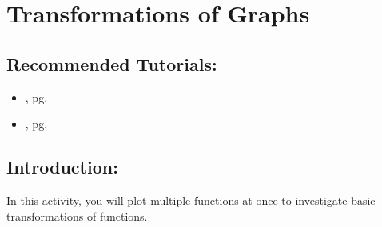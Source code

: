 \section{Transformations of Graphs}
\label{sec:transformations_of_graphs}

\subsection*{Recommended Tutorials:}
\begin{itemize}[noitemsep]
	\item {}, pg. \pageref{chp:plotting_functions}
	\item {}, pg. \pageref{chp:assignment_operator}
\end{itemize}

\subsection*{Introduction:}

In this activity, you will plot multiple functions at once to investigate basic transformations of functions.

